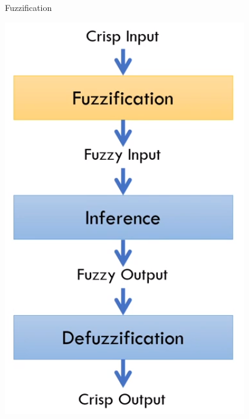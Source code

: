\documentclass[pdflatex,compress,mathserif]{beamer}
\begin{document}
\begin{frame}{Fuzzification}
	\begin{center}
		\includegraphics[height=0.8\textheight]{img/fuzzification}
	\end{center}
\end{frame}
\end{document}
